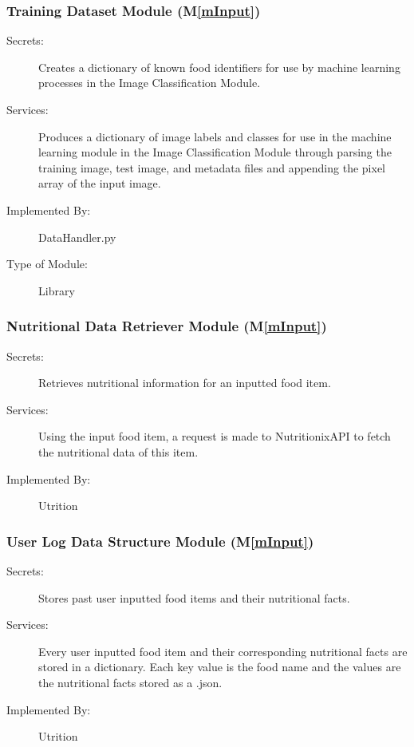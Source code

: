 \documentclass[12pt, titlepage]{article}
\newcommand{\mref}[1]{M\ref{#1}}
\begin{document}
\subsubsection{Training Dataset Module (\mref{mInput})}

\begin{description}
\item[Secrets:] Creates a dictionary of known food identifiers for use by machine learning processes in the Image Classification Module.
\item[Services:] Produces a dictionary of image labels and classes for use in the machine learning module in the Image Classification Module through parsing the training image, test image, and metadata files and appending the pixel array of the input image.
\item[Implemented By:] DataHandler.py
\item[Type of Module:] Library
\end{description}

\subsubsection{Nutritional Data Retriever Module (\mref{mInput})}

\begin{description}
	\item[Secrets:]Retrieves nutritional information for an inputted food item.
	\item[Services:]Using the input food item, a request is made to NutritionixAPI to fetch the nutritional data of this item.
	\item[Implemented By:] Utrition
\end{description}

\subsubsection{User Log Data Structure Module (\mref{mInput})}

\begin{description}
	\item[Secrets:]Stores past user inputted food items and their nutritional facts.
	\item[Services:]Every user inputted food item and their corresponding nutritional facts are stored in a dictionary. Each key value is the food name and the values are the nutritional facts stored as a .json.
	\item[Implemented By:] Utrition
\end{description}
\end{document}

